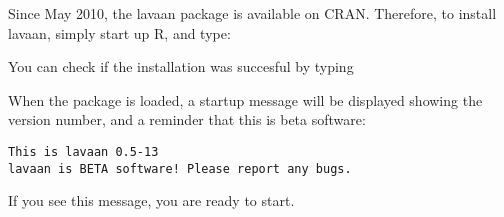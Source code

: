 Since May 2010, the lavaan package is available on CRAN. Therefore, to
install lavaan, simply start up R, and type:

\begin{Shaded}
\begin{Highlighting}[]
\NormalTok{(}\NormalTok{, } \NormalTok{)}
\end{Highlighting}
\end{Shaded}

You can check if the installation was succesful by typing

\begin{Shaded}
\begin{Highlighting}[]
\end{Highlighting}
\end{Shaded}

When the package is loaded, a startup message will be displayed showing
the version number, and a reminder that this is beta software:

\begin{verbatim}
This is lavaan 0.5-13
lavaan is BETA software! Please report any bugs.
\end{verbatim}

If you see this message, you are ready to start.
